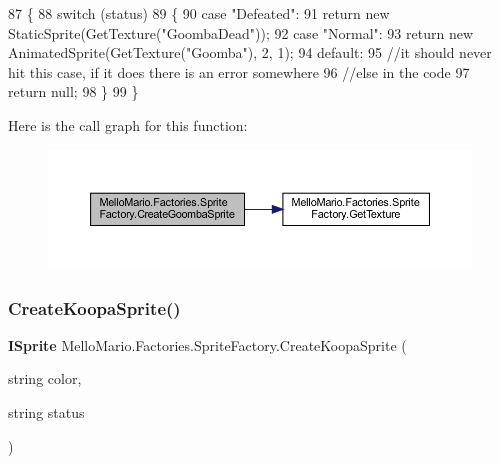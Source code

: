 \begin{DoxyCode}
87         \{
88             \textcolor{keywordflow}{switch} (status)
89             \{
90                 \textcolor{keywordflow}{case} \textcolor{stringliteral}{"Defeated"}:
91                     \textcolor{keywordflow}{return} \textcolor{keyword}{new} StaticSprite(GetTexture(\textcolor{stringliteral}{"GoombaDead"}));
92                 \textcolor{keywordflow}{case} \textcolor{stringliteral}{"Normal"}:
93                     \textcolor{keywordflow}{return} \textcolor{keyword}{new} AnimatedSprite(GetTexture(\textcolor{stringliteral}{"Goomba"}), 2, 1);
94                 \textcolor{keywordflow}{default}:
95                     \textcolor{comment}{//it should never hit this case, if it does there is an error somewhere}
96                     \textcolor{comment}{//else in the code}
97                     \textcolor{keywordflow}{return} null;
98             \}
99         \}
\end{DoxyCode}
Here is the call graph for this function\+:
\nopagebreak
\begin{figure}[H]
\begin{center}
\leavevmode
\includegraphics[width=350pt]{classMelloMario_1_1Factories_1_1SpriteFactory_ae439b845459af63cdb3cee8f2aaba55b_cgraph}
\end{center}
\end{figure}
\mbox{\label{classMelloMario_1_1Factories_1_1SpriteFactory_ae82ad2af40dfed81f46240657130d686}} 
\subsubsection{Create\+Koopa\+Sprite()}
{\footnotesize\ttfamily \textbf{ I\+Sprite} Mello\+Mario.\+Factories.\+Sprite\+Factory.\+Create\+Koopa\+Sprite (\begin{DoxyParamCaption}\item[{string}]{color,  }\item[{string}]{status }\end{DoxyParamCaption})}



